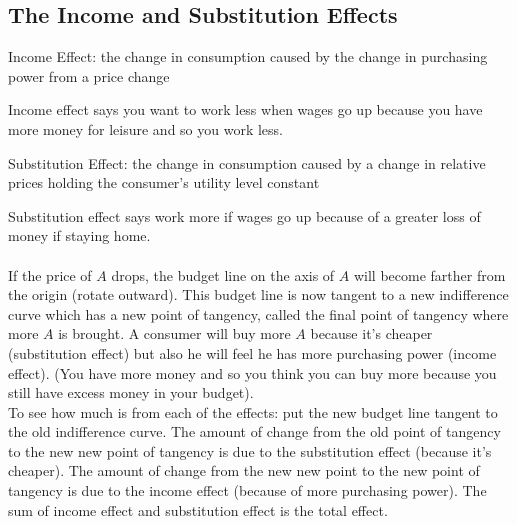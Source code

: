 \documentclass[12pt]{article}
\begin{document}
\subsection{The Income and Substitution Effects} 
\begin{definition} Income Effect: the change in consumption caused by the change in purchasing power from a price change \end{definition} 
Income effect says you want to work less when wages go up because you have more money for leisure and so you work less. 
\begin{definition} Substitution Effect: the change in consumption caused by a change in relative prices holding the consumer's utility level constant \end{definition} 
Substitution effect says work more if wages go up because of a greater loss of money if staying home. \\~\\ 
If the price of $A$ drops, the budget line on the axis of $A$ will become farther from the origin (rotate outward). This budget line is now tangent to a new indifference curve which has a new point of tangency, called the final point of tangency where more $A$ is brought. A consumer will buy more $A$ because it's cheaper (substitution effect) but also he will feel he has more purchasing power (income effect). (You have more money and so you think you can buy more because you still have excess money in your budget). \\
To see how much is from each of the effects: put the new budget line tangent to the old indifference curve. The amount of change from the old point of tangency to the new new point of tangency is due to the substitution effect (because it's cheaper). The amount of change from the new new point to the new point of tangency is due to the income effect (because of more purchasing power). The sum of income effect and substitution effect is the total effect. 
\end{document}
